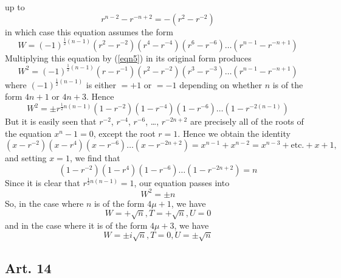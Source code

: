 \documentclass{book}
\theoremstyle{plain}
\theoremstyle{remark}
\begin{document}
up to 
\[r^{n-2}-r^{-n+2} = -(r^2-r^{-2}) \]
in which case this equation assumes the form
\[ W = (-1)^{\frac{1}{2}(n-1)}(r^2-r^{-2})(r^4-r^{-4})(r^6-r^{-6})\dots(r^{n-1}-r^{-n+1}) \]
Multiplying this equation by (\ref{eqn5}) in its original form produces
\[ W^2 = (-1)^{\frac{1}{2}(n-1)}(r-r^{-1})(r^2-r^{-2})(r^3-r^{-3})\dots(r^{n-1}-r^{-n+1}) \]
where $(-1)^{\frac{1}{2}(n-1)}$ is either $=+1$ or $=-1$ depending on whether $n$ is of the form $4n+1$ or $4n+3$. Hence
\[ W^2 = \pm r^{\frac{1}{2}n(n-1)} (1-r^{-2})(1-r^{-4})(1-r^{-6})\dots(1-r^{-2(n-1)}) \]
But it is easily seen that $r^{-2}$, $r^{-4}$, $r^{-6}$, \dots, $r^{-2n+2}$ are precisely all of the roots of the equation $x^n-1=0$, except the root $r=1$. Hence we obtain the identity
\[ (x-r^{-2})(x-r^{4})(x-r^{-6}) \dots (x-r^{-2n+2}) = x^{n-1} + x^{n-2} = x^{n-3} + \textrm{etc.} + x + 1, \]
and setting $x=1$, we find that 
\[ (1-r^{-2})(1-r^{4})(1-r^{-6}) \dots (1-r^{-2n+2}) = n \]
Since it is clear that $r^{\frac{1}{2}n(n-1)}=1$,  our equation passes into
\begin{equation} W^2 = \pm n \label{eqn6} \end{equation}
So, in the case where $n$ is of the form $4\mu+1$, we have 
\[ W = +\sqrt{n}, T = +\sqrt{n}, U = 0 \]
and in the case where it is of the form $4\mu+3$, we have
\[ W = \pm i \sqrt{n}, T = 0, U = \pm \sqrt{n} \]

\subsection*{Art. 14} 
\end{document}
